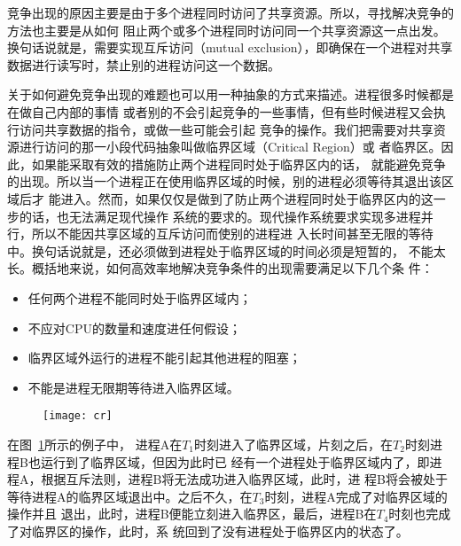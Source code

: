 \documentclass{swfcthesismscctex}
\begin{document}
竞争出现的原因主要是由于多个进程同时访问了共享资源。所以，寻找解决竞争的方法也主要是从如何
阻止两个或多个进程同时访问同一个共享资源这一点出发。换句话说就是，需要实现互斥访问（mutual
exclusion），即确保在一个进程对共享数据进行读写时，禁止别的进程访问这一个数据。

关于如何避免竞争出现的难题也可以用一种抽象的方式来描述。进程很多时候都是在做自己内部的事情
或者别的不会引起竞争的一些事情，但有些时候进程又会执行访问共享数据的指令，或做一些可能会引起
竞争的操作。我们把需要对共享资源进行访问的那一小段代码抽象叫做临界区域（Critical Region）或
者临界区\cite{Raynal12}。因此，如果能采取有效的措施防止两个进程同时处于临界区内的话，
就能避免竞争的出现。所以当一个进程正在使用临界区域的时候，别的进程必须等待其退出该区域后才
能进入。然而，如果仅仅是做到了防止两个进程同时处于临界区内的这一步的话，也无法满足现代操作
系统的要求的。现代操作系统要求实现多进程并行，所以不能因共享区域的互斥访问而使别的进程进
入长时间甚至无限的等待中。换句话说就是，还必须做到进程处于临界区域的时间必须是短暂的，
不能太长。概括地来说，如何高效率地解决竞争条件的出现需要满足以下几个条
件\cite{Jonhesmt08}：
\begin{itemize}
\item 任何两个进程不能同时处于临界区域内；
\item 不应对CPU的数量和速度进任何假设；
\item 临界区域外运行的进程不能引起其他进程的阻塞；
\item 不能是进程无限期等待进入临界区域。
\end{itemize}

\begin{figure}[ht]
  \centering
  \texttt{[image: cr]}
  \label{fig:critical}
\end{figure}

在图~\ref{fig:critical}\cite{tanenbaum2008modern}所示的例子中，
进程A在$T_1$时刻进入了临界区域，片刻之后，在$T_2$时刻进程B也运行到了临界区域，但因为此时已
经有一个进程处于临界区域内了，即进程A，根据互斥法则，进程B将无法成功进入临界区域，此时，进
程B将会被处于等待进程A的临界区域退出中。之后不久，在$T_3$时刻，进程A完成了对临界区域的操作并且
退出，此时，进程B便能立刻进入临界区，最后，进程B在$T_4$时刻也完成了对临界区的操作，此时，系
统回到了没有进程处于临界区内的状态了。

\end{document}
